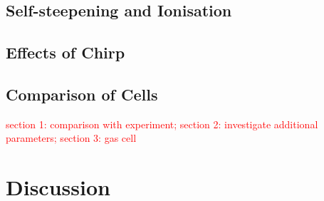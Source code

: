 \documentclass[a4paper]{jpconf}
\begin{document}
\subsection{Self-steepening and Ionisation}


\subsection{Effects of Chirp}


\subsection{Comparison of Cells}

\textcolor{red}{section 1: comparison with experiment; section 2: investigate additional parameters; section 3: gas cell}




\cite{reiter2010}

\section{Discussion}
\end{document}
